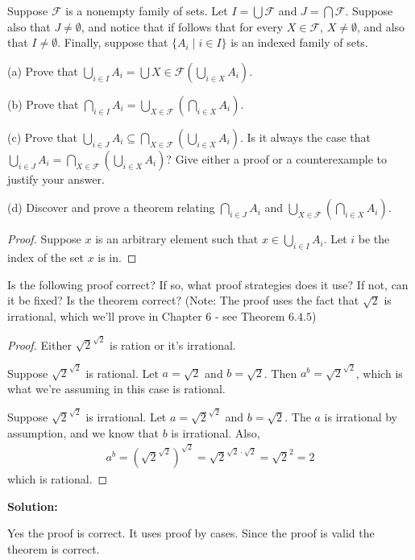\begin{tcolorbox}[title=Problem 6, breakable]
    Suppose $\mathcal{F}$ is a nonempty family of sets. Let $I = \bigcup \mathcal{F}$ and $J = \bigcap \mathcal{F}$.
    Suppose also that $J \not = \emptyset$, and notice that if follows that for every $X \in \mathcal{F}$,
    $X \not = \emptyset$, and also that $I \not = \emptyset$. Finally, suppose that $\{A_i \mid i \in I\}$
    is an indexed family of sets.

    (a) Prove that $\bigcup_{i \in I} A_i = \bigcup{X \in \mathcal{F}}(\bigcup_{i \in X} A_i)$.

    (b) Prove that $\bigcap_{i \in I} A_i = \bigcup_{X \in \mathcal{F}}(\bigcap_{i \in X} A_i)$.

    (c) Prove that $\bigcup_{i \in J} A_i \subseteq \bigcap_{X \in \mathcal{F}}(\bigcup_{i \in X} A_i)$. 
    Is it always the case that $\bigcup_{i \in J} A_i = \bigcap_{X \in \mathcal{F}}(\bigcup_{i \in X} A_i)$?
    Give either a proof or a counterexample to justify your answer.

    (d) Discover and prove a theorem relating $\bigcap_{i \in J} A_i$ and $\bigcup_{X \in \mathcal{F}}(\bigcap_{i \in X} A_i)$.
\end{tcolorbox}

\begin{proof}
    Suppose $x$ is an arbitrary element such that $x \in \bigcup_{i \in I} A_i$. 
    Let $i$ be the index of the set $x$ is in. 
\end{proof}

\begin{tcolorbox}[title=Problem 10, breakable]
    Is the following proof correct? If so, what proof strategies does it use?
    If not, can it be fixed? Is the theorem correct? (Note: The proof uses
    the fact that $\sqrt{2}$ is irrational, which we'll prove in Chapter 6 -
    see Theorem $6.4.5$)
    \begin{proof}
        Either $\sqrt{2}^{\sqrt{2}}$ is ration or it's irrational.

        Suppose $\sqrt{2}^{\sqrt{2}}$ is rational. Let $a = \sqrt{2}$ and $b =
            \sqrt{2}$. Then $a^b = \sqrt{2}^{\sqrt{2}}$, which is what we're assuming in
        this case is rational.

        Suppose $\sqrt{2}^{\sqrt{2}}$ is irrational. Let $a = \sqrt{2}^{\sqrt{2}}$ and
        $b = \sqrt{2}$. The $a$ is irrational by assumption, and we know that $b$ is
        irrational. Also,
        \begin{align*}
            a^b = (\sqrt{2}^{\sqrt{2}})^{\sqrt{2}} = \sqrt{2}^{\sqrt{2} \cdot \sqrt{2}} = \sqrt{2}^2 = 2
        \end{align*}
        which is rational.
    \end{proof}
\end{tcolorbox}

\textbf{Solution:}

Yes the proof is correct. It uses proof by cases. Since the proof is valid the
theorem is correct.
